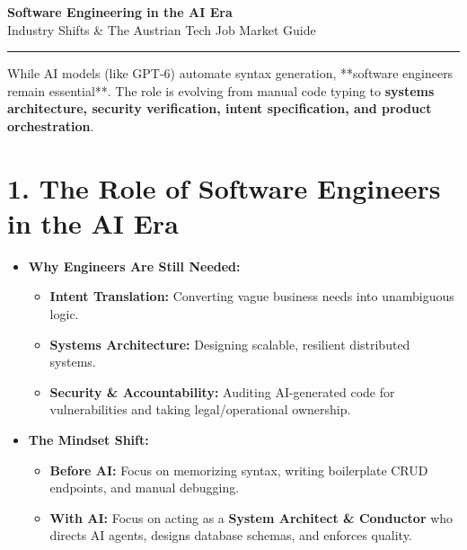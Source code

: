 \documentclass[11pt,a4paper]{article}
\begin{document}
\begin{center}
    {\Huge \bfseries \color{primary} Software Engineering in the AI Era} \\[0.4em]
    {\Large \color{secondary} Industry Shifts \& The Austrian Tech Job Market Guide} \\[0.8em]
    \rule{\linewidth}{1.5pt}
\end{center}

\vspace{0.5em}

\begin{tcolorbox}[colback=lightbg,colframe=primary,title=\textbf{Executive Summary}]
While AI models (like GPT-6) automate syntax generation, **software engineers remain essential**. The role is evolving from manual code typing to \textbf{systems architecture, security verification, intent specification, and product orchestration}. 
\end{tcolorbox}

\section{1. The Role of Software Engineers in the AI Era}

\begin{itemize}[leftmargin=1.5em]
    \item \textbf{Why Engineers Are Still Needed:}
    \begin{itemize}
        \item \textbf{Intent Translation:} Converting vague business needs into unambiguous logic.
        \item \textbf{Systems Architecture:} Designing scalable, resilient distributed systems.
        \item \textbf{Security \& Accountability:} Auditing AI-generated code for vulnerabilities and taking legal/operational ownership.
    \end{itemize}
    
    \item \textbf{The Mindset Shift:}
    \begin{itemize}
        \item \textbf{Before AI:} Focus on memorizing syntax, writing boilerplate CRUD endpoints, and manual debugging.
        \item \textbf{With AI:} Focus on acting as a \textbf{System Architect \& Conductor} who directs AI agents, designs database schemas, and enforces quality.
    \end{itemize}
\end{itemize}
\end{document}
